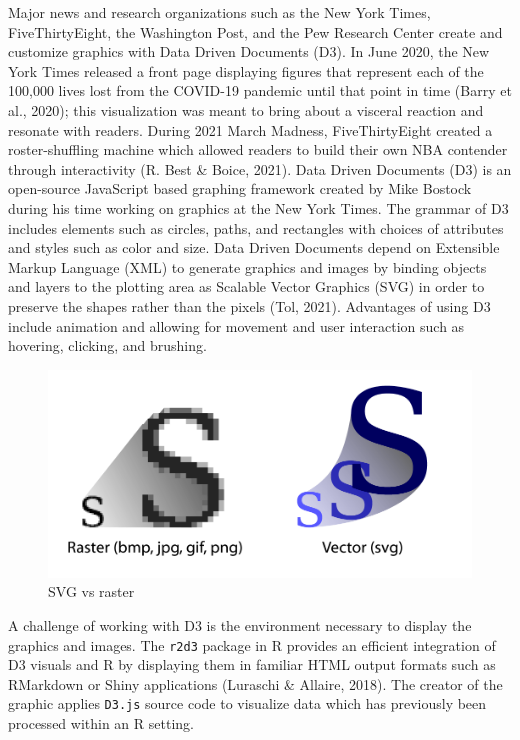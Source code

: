 \documentclass[print]{nuthesis}
\begin{document}
Major news and research organizations such as the New York Times, FiveThirtyEight, the Washington Post, and the Pew Research Center create and customize graphics with Data Driven Documents (D3).
In June 2020, the New York Times released a front page displaying figures that represent each of the 100,000 lives lost from the COVID-19 pandemic until that point in time (Barry et al., 2020); this visualization was meant to bring about a visceral reaction and resonate with readers.
During 2021 March Madness, FiveThirtyEight created a roster-shuffling machine which allowed readers to build their own NBA contender through interactivity (R. Best \& Boice, 2021).
Data Driven Documents (D3) is an open-source JavaScript based graphing framework created by Mike Bostock during his time working on graphics at the New York Times.
The grammar of D3 includes elements such as circles, paths, and rectangles with choices of attributes and styles such as color and size.
Data Driven Documents depend on Extensible Markup Language (XML) to generate graphics and images by binding objects and layers to the plotting area as Scalable Vector Graphics (SVG) in order to preserve the shapes rather than the pixels  (Tol, 2021).
Advantages of using D3 include animation and allowing for movement and user interaction such as hovering, clicking, and brushing.

\begin{figure}[tbp]

{\centering \includegraphics[width=0.7\linewidth,]{images/02-you-draw-it/raster-vs-vector} 

}

\caption{SVG vs raster}\label{fig:raster-vs-vector}
\end{figure}

A challenge of working with D3 is the environment necessary to display the graphics and images.
The \texttt{r2d3} package in R provides an efficient integration of D3 visuals and R by displaying them in familiar HTML output formats such as RMarkdown or Shiny applications (Luraschi \& Allaire, 2018).
The creator of the graphic applies \texttt{D3.js} source code to visualize data which has previously been processed within an R setting.
\end{document}
